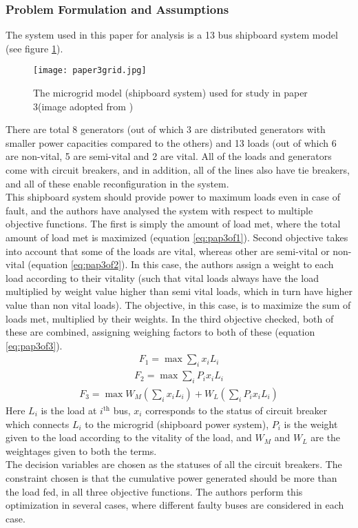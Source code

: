 \subsubsection{Problem Formulation and Assumptions}
The system used in this paper for analysis is a 13 bus shipboard system model (see figure \ref{fig:pap3grid}).
\begin{figure}[tbp]
  \centering
    \texttt{[image: paper3grid.jpg]}%
    \caption[Paper 3 Microgrid System]{The microgrid model (shipboard system) used for study in paper 3(image adopted from \cite{Shariatzadeh2015})}
    \label{fig:pap3grid} 
\end{figure}
There are total 8 generators (out of which 3 are distributed generators with smaller power capacities compared to the others) and 13 loads (out of which 6 are non-vital, 5 are semi-vital and 2 are vital. All of the loads and generators come with circuit breakers, and in addition, all of the lines also have tie breakers, and all of these enable reconfiguration in the system.\\
This shipboard system should provide power to maximum loads even in case of fault, and the authors have analysed the system with respect to multiple objective functions. The first is simply the amount of load met, where the total amount of load met is maximized (equation \eqref{eq:pap3of1}). Second objective takes into account that some of the loads are vital, whereas other are semi-vital or non-vital (equation \eqref{eq:pap3of2}). In this case, the authors assign a weight to each load according to their vitality (such that vital loads always have the load multiplied by weight value higher than semi vital loads, which in turn have higher value than non vital loads). The objective, in this case, is to maximize the sum of loads met, multiplied by their weights. In the third objective checked, both of these are combined, assigning weighing factors to both of these (equation \eqref{eq:pap3of3}). \\
\begin{eqnarray}
\label{eq:pap3of1}
F_1 = \max\sum_i x_iL_i
\end{eqnarray}
\begin{eqnarray}
\label{eq:pap3of2}
F_2 = \max\sum_i P_ix_iL_i
\end{eqnarray}
\begin{eqnarray}
\label{eq:pap3of3}
F_3 = \max W_M(\sum_i x_iL_i)+W_L(\sum_i P_ix_iL_i)
\end{eqnarray}
Here $L_i$ is the load at $i^{\text{th}}$ bus, $x_i$ corresponds to the status of circuit breaker which connects $L_i$ to the microgrid (shipboard power system), $P_i$ is the weight given to the load according to the vitality of the load, and $W_M$ and $W_L$ are the weightages given to both the terms.\\
The decision variables are chosen as the statuses of all the circuit breakers. The constraint chosen is that the cumulative power generated should be  more than the load fed, in all three objective functions. The authors perform this optimization in several cases, where different faulty buses are considered in each case.
